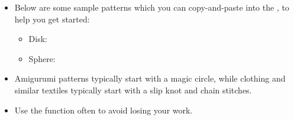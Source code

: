 \documentclass[main.tex]{subfiles}
\begin{document}
\begin{itemize}
\item Below are some sample patterns which you can copy-and-paste into the \PTI, to help you get started:
    \begin{itemize}
    \item Disk: \\

    \item Sphere: \\
    \end{itemize}

\item Amigurumi patterns typically start with a magic circle, while clothing and similar textiles typically start with a slip knot and chain stitches.
\item Use the  function often to avoid losing your work.
\end{itemize}
\end{document}
